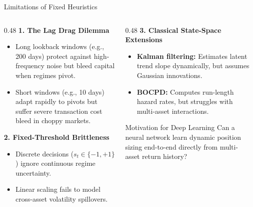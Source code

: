 \documentclass[10pt]{beamer}
\begin{document}
\begin{frame}{Limitations of Fixed Heuristics}
  \begin{columns}[t]
    \begin{column}{0.48\textwidth}
      \textbf{\scriptsize 1. The Lag Drag Dilemma}
      \begin{itemize}\scriptsize
        \item Long lookback windows (e.g., 200 days) protect against high-frequency noise but bleed capital when regimes pivot.
        \item Short windows (e.g., 10 days) adapt rapidly to pivots but suffer severe transaction cost bleed in choppy markets.
      \end{itemize}
      \vspace{0.1cm}
      \textbf{\scriptsize 2. Fixed-Threshold Brittleness}
      \begin{itemize}\scriptsize
        \item Discrete decisions ($s_t \in \{-1, +1\}$) ignore continuous regime uncertainty.
        \item Linear scaling fails to model cross-asset volatility spillovers.
      \end{itemize}
    \end{column}
    \begin{column}{0.48\textwidth}
      \textbf{\scriptsize 3. Classical State-Space Extensions}
      \begin{itemize}\scriptsize
        \item \textbf{Kalman filtering:} Estimates latent trend slope dynamically, but assumes Gaussian innovations.
        \item \textbf{BOCPD:} Computes run-length hazard rates, but struggles with multi-asset interactions.
      \end{itemize}
      \vspace{0.1cm}
      \begin{alertblock}{Motivation for Deep Learning}
        Can a neural network learn dynamic position sizing end-to-end directly from multi-asset return history?
      \end{alertblock}
    \end{column}
  \end{columns}
\end{frame}
\end{document}
